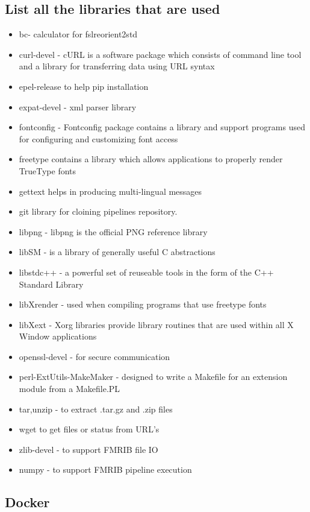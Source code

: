 \subsection{List all the libraries that are used}
\begin{itemize}
 \item bc- calculator for fslreorient2std
 \item curl-devel - cURL is a software package which consists of command line tool and a library for transferring data using URL syntax
 \item epel-release to help pip installation
 \item expat-devel - xml parser library
\item fontconfig - Fontconfig package contains a library and support programs used for configuring and customizing font access
 \item freetype contains a library which allows applications to properly render TrueType fonts
 \item gettext helps in producing multi-lingual messages
\item git library for cloining pipelines repository.
\item libpng - libpng is the official PNG reference library
\item libSM - is a library of generally useful C abstractions
\item libstdc++ - a powerful set of reuseable tools in the form of the C++ Standard Library
\item libXrender - used when compiling programs that use freetype fonts
\item libXext - Xorg libraries provide library routines that are used within all X Window applications
\item openssl-devel - for secure communication
\item perl-ExtUtils-MakeMaker - designed to write a Makefile for an extension module from a Makefile.PL
\item tar,unzip - to extract .tar.gz and .zip files
\item wget to get files or status from URL's
\item zlib-devel - to support FMRIB file IO
\item numpy - to support FMRIB pipeline execution
\end{itemize}

\subsection{Docker}

